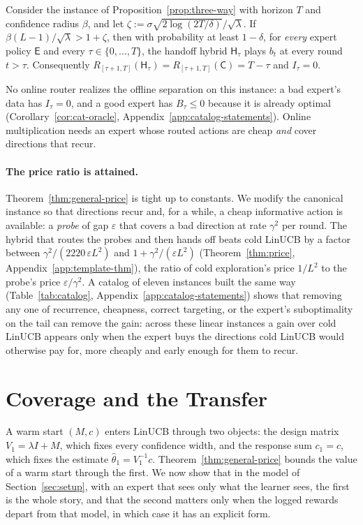 \documentclass[anon]{alt2027} %
\newcommand{\eps}{\varepsilon}
\newcommand{\Cold}{\mathsf{C}}
\newcommand{\Exp}{\mathsf{E}}
\newcommand{\Hyb}{\mathsf{H}}
\begin{document}
\begin{proposition}
\label{prop:one-pass}
Consider the instance of Proposition~\ref{prop:three-way} with horizon $T$
and confidence radius $\beta$, and let $\zeta:=\sigma\sqrt{2\log(2T/\delta)}/\sqrt\lambda$.
If $\beta(L-1)/\sqrt\lambda>1+\zeta$, then with probability at least
$1-\delta$, for \emph{every} expert policy $\Exp$ and every $\tau\in\{0,\dots,T\}$,
the handoff hybrid $\Hyb_\tau$ plays $b_t$ at every round $t>\tau$. Consequently
$R_{[\tau+1,T]}(\Hyb_\tau)=R_{[\tau+1,T]}(\Cold)=T-\tau$ and $I_\tau=0$.
\end{proposition}

No online router realizes the offline separation on this instance: a bad
expert's data has $I_\tau=0$, and a good expert has $B_\tau\le0$ because it is
already optimal (Corollary~\ref{cor:cat-oracle},
Appendix~\ref{app:catalog-statements}). Online multiplication needs an expert
whose routed actions are cheap \emph{and} cover directions that recur.

\paragraph{The price ratio is attained.}
Theorem~\ref{thm:general-price} is tight up to constants. We modify the
canonical instance so that directions recur and, for a while, a cheap
informative action is available: a \emph{probe} of gap $\eps$ that covers a
bad direction at rate $\gamma^2$ per round. The hybrid that routes the probes
and then hands off beats cold LinUCB by a factor between
$\gamma^2/(2220\,\eps L^2)$ and $1+\gamma^2/(\eps L^2)$
(Theorem~\ref{thm:price}, Appendix~\ref{app:template-thm}), the ratio of cold
exploration's price $1/L^2$ to the probe's price $\eps/\gamma^2$. A catalog of
eleven instances built the same way (Table~\ref{tab:catalog},
Appendix~\ref{app:catalog-statements}) shows that removing any one of
recurrence, cheapness, correct targeting, or the expert's suboptimality on
the tail can remove the gain: across these linear instances a gain over cold
LinUCB appears only when the expert buys the directions cold LinUCB would
otherwise pay for, more cheaply and early enough for them to recur.

\section{Coverage and the Transfer}
\label{sec:two-channels}

A warm start $(M,c)$ enters LinUCB through two objects: the design matrix
$V_1=\lambda I+M$, which fixes every confidence width, and the response sum
$c_1=c$, which fixes the estimate $\widehat\theta_1=V_1^{-1}c$.
Theorem~\ref{thm:general-price} bounds the value of a warm start through the
first. We now show that in the model of Section~\ref{sec:setup}, with an
expert that sees only what the learner sees, the first is the whole story,
and that the second matters only when the logged rewards depart from that
model, in which case it has an explicit form.
\end{document}
